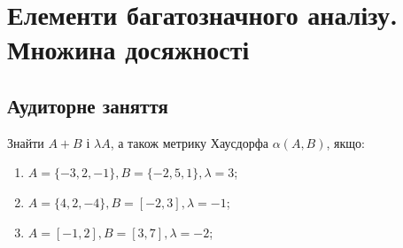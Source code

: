
\section{Елементи багатозначного аналізу. Множина досяжності}

\subsection{Аудиторне заняття}

\begin{problem}
	Знайти $A + B$ і $\lambda A$, а також метрику Хаусдорфа $\alpha (A, B)$, якщо:
	
	\begin{enumerate}
	    \item $A = \{-3, 2, -1\},  B = \{-2, 5, 1\},  \lambda = 3$;
	    
	    \item $A = \{4, 2, -4\},  B = [-2, 3],  \lambda = -1$;
	    
	    \item $A = [-1, 2],  B = [3, 7],  \lambda = -2$;
	    
	\end{enumerate}
	
\end{problem}


